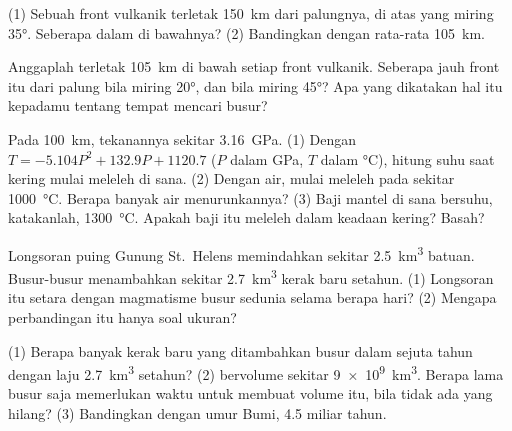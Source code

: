 \begin{exercise}[$\star\star$]\label{exo:g12:subduction-magmatism:6}
(1) Sebuah front vulkanik terletak \qty{150}{km} dari palungnya, di atas
 yang miring \ang{35}. Seberapa dalam  di bawahnya?
(2) Bandingkan dengan rata-rata \qty{105}{km}.
\end{exercise}

\begin{exercise}[$\star\star$]\label{exo:g12:subduction-magmatism:7}
Anggaplah  terletak \qty{105}{km} di bawah setiap front vulkanik.
Seberapa jauh front itu dari palung bila  miring \ang{20}, dan bila
miring \ang{45}? Apa yang dikatakan hal itu kepadamu tentang tempat mencari
busur?
\end{exercise}

\begin{exercise}[$\star\star$]\label{exo:g12:subduction-magmatism:8}
Pada \qty{100}{km}, tekanannya sekitar \qty{3.16}{GPa}. (1) Dengan $T =
-5.104P^2 + 132.9P + 1120.7$ ($P$ dalam \unit{GPa}, $T$ dalam \unit{\celsius}),
hitung suhu saat  kering mulai meleleh di sana. (2) Dengan air,
 mulai meleleh pada sekitar \qty{1000}{\celsius}. Berapa banyak air
menurunkannya? (3) Baji mantel di sana bersuhu, katakanlah,
\qty{1300}{\celsius}. Apakah baji itu meleleh dalam keadaan kering? Basah?
\end{exercise}

\begin{exercise}[$\star\star$]\label{exo:g12:subduction-magmatism:9}
Longsoran puing Gunung St.~Helens memindahkan sekitar \qty{2.5}{km^3} batuan.
Busur-busur menambahkan sekitar \qty{2.7}{km^3} kerak baru setahun. (1) Longsoran
itu setara dengan magmatisme busur sedunia selama berapa hari? (2) Mengapa
perbandingan itu hanya soal ukuran?
\end{exercise}

\begin{exercise}[$\star\star$]\label{exo:g12:subduction-magmatism:10}
(1) Berapa banyak kerak baru yang ditambahkan busur dalam sejuta tahun dengan
laju \qty{2.7}{km^3} setahun? (2)  bervolume sekitar
\qty{9e9}{km^3}. Berapa lama busur saja memerlukan waktu untuk membuat volume
itu, bila tidak ada yang hilang? (3) Bandingkan dengan umur Bumi, 4.5 miliar
tahun.
\end{exercise}


